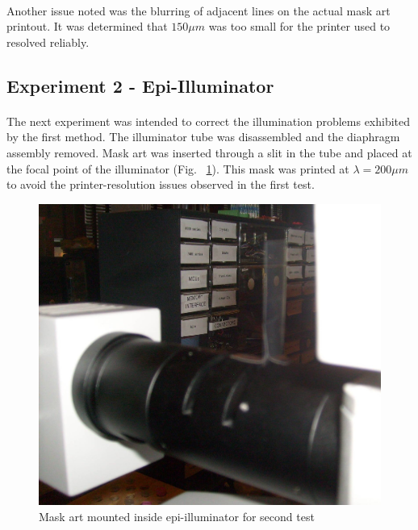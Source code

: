 \documentclass[twocolumn]{article}
\begin{document}
\paragraph*{}
Another issue noted was the blurring of adjacent lines on the actual mask art printout. It was determined that $150
\mu m$ was too small for the printer used to resolved reliably.

\subsection{Experiment 2 - Epi-Illuminator}
\paragraph*{}
The next experiment was intended to correct the illumination problems exhibited by the first method. The illuminator 
tube was disassembled and the diaphragm assembly removed. Mask art was inserted through a slit in the tube and placed
at the focal point of the illuminator (Fig. ~\ref{second-test}). This mask was printed at $\lambda = 200 \mu m$ to avoid
the printer-resolution issues observed in the first test.

\begin{figure}[h]
\begin{center}
\includegraphics[scale=0.1]{second-test.jpg}
\end{center}
\caption{Mask art mounted inside epi-illuminator for second test}
\label{second-test}
\end{figure}
\end{document}
